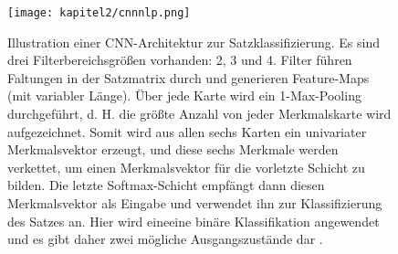 \begin{figure}[H]
  \centering
  \texttt{[image: kapitel2/cnnnlp.png]}
  \caption[CNN in der Textverarbeitung]{Illustration einer CNN-Architektur zur Satzklassifizierung. Es sind drei Filterbereichsgrößen vorhanden: 2, 3 und 4. Filter führen Faltungen in der Satzmatrix durch und generieren Feature-Maps (mit variabler Länge). Über jede Karte wird ein 1-Max-Pooling durchgeführt, d. H. die größte Anzahl von jeder Merkmalskarte wird aufgezeichnet. Somit wird aus allen sechs Karten ein univariater Merkmalsvektor erzeugt, und diese sechs Merkmale werden verkettet, um einen Merkmalsvektor für die vorletzte Schicht zu bilden. Die letzte Softmax-Schicht empfängt dann diesen Merkmalsvektor als Eingabe und verwendet ihn zur Klassifizierung des Satzes an. Hier wird eineeine binäre Klassifikation angewendet und es gibt daher zwei mögliche Ausgangszustände dar \cite*{Zhang}.}
  \label{Kap2:Pooling}
\end{figure}




